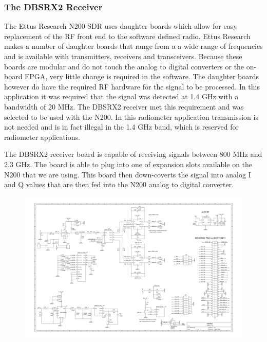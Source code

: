 \subsubsection{The DBSRX2 Receiver}

The Ettus Research N200 SDR uses daughter boards which allow for easy replacement of the RF front end to the software defined radio.  Ettus Research makes a number of daughter boards that range from a a wide range of frequencies and is available with transmitters, receivers and transceivers.  Because these boards are modular and do not touch the analog to digital converters or the on-board FPGA, very little change is required in the software.  The daughter boards however do have the required RF hardware for the signal to be processed.  In this application it was required that the signal was detected at 1.4 GHz with a bandwidth of 20 MHz.  The DBSRX2 receiver met this requirement and was selected to be used with the N200.  In this radiometer application transmission is not needed and is in fact illegal in the 1.4 GHz band, which is reserved for radiometer applications.

The DBSRX2 receiver board is capable of receiving signals between 800 MHz and 2.3 GHz.  The board is able to plug into one of expansion slots available on the N200 that we are using.  This board then down-coverts the signal into analog I and Q values that are then fed into the N200 analog to digital converter.

{\begin{figure}[h!tb] 
\centering
\includegraphics{Images/dbsrx2}
\label{dbsrx2}
\end{figure}
}

